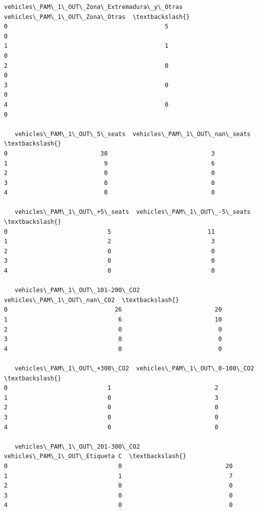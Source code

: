\documentclass[11pt]{article}
\begin{document}
\begin{tcolorbox}[breakable, size=fbox, boxrule=.5pt, pad at break*=1mm, opacityfill=0]
\begin{Verbatim}[commandchars=\\\{\}]
   vehicles\_PAM\_1\_OUT\_Zona\_Extremadura\_y\_Otras  vehicles\_PAM\_1\_OUT\_Zona\_Otras  \textbackslash{}
0                                            5                              0
1                                            1                              0
2                                            0                              0
3                                            0                              0
4                                            0                              0

   vehicles\_PAM\_1\_OUT\_5\_seats  vehicles\_PAM\_1\_OUT\_nan\_seats  \textbackslash{}
0                          30                             3
1                           9                             6
2                           0                             0
3                           0                             0
4                           0                             0

   vehicles\_PAM\_1\_OUT\_+5\_seats  vehicles\_PAM\_1\_OUT\_-5\_seats  \textbackslash{}
0                            5                           11
1                            2                            3
2                            0                            0
3                            0                            0
4                            0                            0

   vehicles\_PAM\_1\_OUT\_101-200\_CO2  vehicles\_PAM\_1\_OUT\_nan\_CO2  \textbackslash{}
0                              26                          20
1                               6                          10
2                               0                           0
3                               0                           0
4                               0                           0

   vehicles\_PAM\_1\_OUT\_+300\_CO2  vehicles\_PAM\_1\_OUT\_0-100\_CO2  \textbackslash{}
0                            1                             2
1                            0                             3
2                            0                             0
3                            0                             0
4                            0                             0

   vehicles\_PAM\_1\_OUT\_201-300\_CO2  vehicles\_PAM\_1\_OUT\_Etiqueta C  \textbackslash{}
0                               0                             20
1                               1                              7
2                               0                              0
3                               0                              0
4                               0                              0


\end{Verbatim}
\end{tcolorbox}
\end{document}
